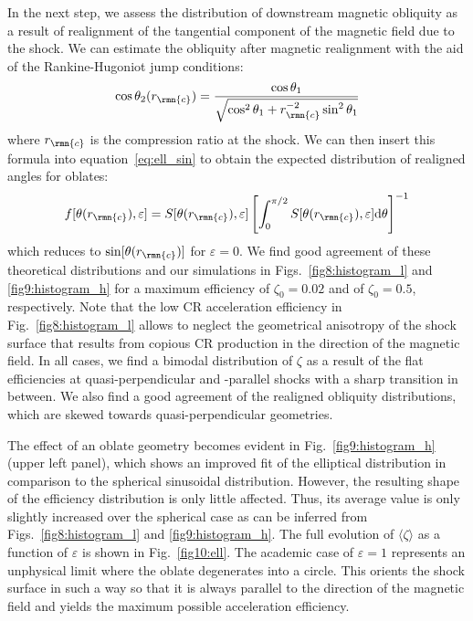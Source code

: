 \documentclass[8pt,a4paper,usenatbib]{mnras}
\newcommand{\de}{\mathrm{d}}
\renewcommand{\epsilon}{\varepsilon}
\begin{document}
In the next step, we assess the distribution of downstream magnetic obliquity as
a result of realignment of the tangential component of the magnetic field due to
the shock.  We can estimate the obliquity after magnetic realignment with the
aid of the Rankine-Hugoniot jump conditions:
\begin{equation}
\label{eq:mag_rel}
\cos\theta_2 (r_{\rmn{c}})=
\dfrac{\cos\theta_1}{\sqrt{\cos^2\theta_1 + r_{\rmn{c}}^{-2} \sin^2\theta_1}}
\end{equation}
where $r_{\rmn{c}}$ is the compression ratio at the shock. We can then insert
this formula into equation~\eqref{eq:ell_sin} to obtain the expected distribution
of realigned angles for oblates:
\begin{equation}
\label{eq:f(t(r))}
f[\theta(r_{\rmn{c}}),\epsilon] = S[\theta(r_{\rmn{c}}),\epsilon]
\left[ \int_0^{\pi/2} S[\theta(r_{\rmn{c}}),\epsilon] \de \theta \right]^{-1}
\end{equation}
which reduces to $\sin[\theta(r_{\rmn{c}})]$ for $\epsilon = 0$. We find good
agreement of these theoretical distributions and our simulations in
Figs.~\ref{fig8:histogram_l} and \ref{fig9:histogram_h} for a maximum efficiency
of $\zeta_0 = 0.02$ and of $\zeta_0 = 0.5$, respectively.  Note that the low CR
acceleration efficiency in Fig.~\ref{fig8:histogram_l} allows to neglect the
geometrical anisotropy of the shock surface that results from copious CR
production in the direction of the magnetic field. In all cases, we find a
bimodal distribution of $\zeta$ as a result of the flat efficiencies at
quasi-perpendicular and -parallel shocks with a sharp transition in between.  We
also find a good agreement of the realigned obliquity distributions, which are
skewed towards quasi-perpendicular geometries.

The effect of an oblate geometry becomes evident in Fig.~\ref{fig9:histogram_h}
(upper left panel), which shows an improved fit of the elliptical distribution
in comparison to the spherical sinusoidal distribution. However, the resulting
shape of the efficiency distribution is only little affected. Thus, its average
value is only slightly increased over the spherical case as can be inferred from
Figs.~\ref{fig8:histogram_l} and \ref{fig9:histogram_h}. The full evolution of
$\langle \zeta \rangle$ as a function of $\epsilon$ is shown in
Fig.~\ref{fig10:ell}. The academic case of $\epsilon=1$ represents an unphysical
limit where the oblate degenerates into a circle. This orients the shock surface
in such a way so that it is always parallel to the direction of the magnetic
field and yields the maximum possible acceleration efficiency.
\end{document}
